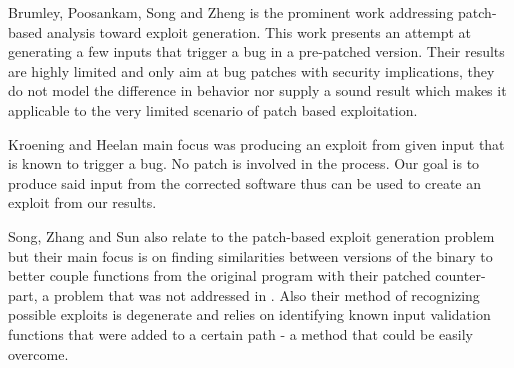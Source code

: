 Brumley, Poosankam, Song and Zheng \cite{AutoPatch} is the prominent work addressing patch-based analysis toward exploit generation. This work presents an attempt at generating a few inputs that trigger a bug in a pre-patched version. Their results are highly limited and only aim at bug patches with security implications, they do not model the difference in behavior nor supply a sound result which makes it applicable to the very limited scenario of patch based exploitation.

Kroening and Heelan \cite{AutoExploit} main focus was producing an exploit from given input that is known to trigger a bug. No patch is involved in the process. Our goal is to produce said input from the corrected software thus \cite{AutoExploit} can be used to create an exploit from our results.

Song, Zhang and Sun \cite{AutoBinary} also relate to the patch-based exploit generation problem but their main focus is on finding similarities between versions of the binary to better couple functions from the original program with their patched counter-part, a problem that was not addressed in \cite{AutoPatch}. Also their method of recognizing possible exploits is degenerate and relies on identifying known input validation functions that were added to a certain path - a method that could be easily overcome.
